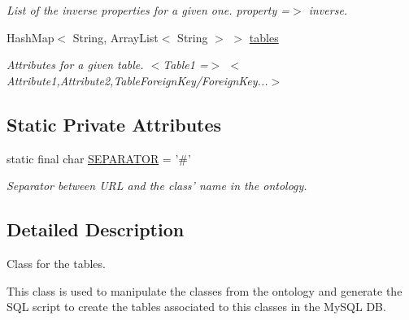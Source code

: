 \begin{DoxyCompactItemize}
\begin{DoxyCompactList}\small\item\em List of the inverse properties for a given one.  property =$>$ inverse. \end{DoxyCompactList}\item 
\hypertarget{class_data_base_1_1_tables_ae6cd882f76e6474bd85b97b5013437ca}{
HashMap$<$ String, ArrayList$<$ String $>$ $>$ \hyperlink{class_data_base_1_1_tables_ae6cd882f76e6474bd85b97b5013437ca}{tables}}
\label{class_data_base_1_1_tables_ae6cd882f76e6474bd85b97b5013437ca}

\begin{DoxyCompactList}\small\item\em Attributes for a given table.  $<$Table1 =$>$ $<$Attribute1,Attribute2,TableForeignKey/ForeignKey...$>$ \end{DoxyCompactList}\end{DoxyCompactItemize}
\subsection*{Static Private Attributes}
\begin{DoxyCompactItemize}
\item 
\hypertarget{class_data_base_1_1_tables_a7105339ab124b92dd2a47f67a497a556}{
static final char \hyperlink{class_data_base_1_1_tables_a7105339ab124b92dd2a47f67a497a556}{SEPARATOR} = '\#'}
\label{class_data_base_1_1_tables_a7105339ab124b92dd2a47f67a497a556}

\begin{DoxyCompactList}\small\item\em Separator between URL and the class' name in the ontology. \end{DoxyCompactList}\end{DoxyCompactItemize}


\subsection{Detailed Description}
Class for the tables. 

This class is used to manipulate the classes from the ontology and generate the SQL script to create the tables associated to this classes in the MySQL DB. 

